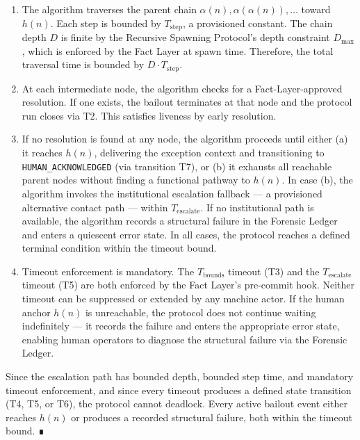 \begin{enumerate}
\item The algorithm traverses the parent chain $\alpha(n), \alpha(\alpha(n)), \ldots$ toward $h(n)$. Each step is bounded by $T_{\text{step}}$, a provisioned constant. The chain depth $D$ is finite by the Recursive Spawning Protocol's depth constraint $D_{\text{max}}$, which is enforced by the Fact Layer at spawn time. Therefore, the total traversal time is bounded by $D \cdot T_{\text{step}}$.

\item At each intermediate node, the algorithm checks for a Fact-Layer-approved resolution. If one exists, the bailout terminates at that node and the protocol run closes via T2. This satisfies liveness by early resolution.

\item If no resolution is found at any node, the algorithm proceeds until either (a) it reaches $h(n)$, delivering the exception context and transitioning to \texttt{HUMAN\_ACKNOWLEDGED} (via transition T7), or (b) it exhausts all reachable parent nodes without finding a functional pathway to $h(n)$. In case (b), the algorithm invokes the institutional escalation fallback — a provisioned alternative contact path — within $T_{\text{escalate}}$. If no institutional path is available, the algorithm records a structural failure in the Forensic Ledger and enters a quiescent error state. In all cases, the protocol reaches a defined terminal condition within the timeout bound.

\item Timeout enforcement is mandatory. The $T_{\text{bounds}}$ timeout (T3) and the $T_{\text{escalate}}$ timeout (T5) are both enforced by the Fact Layer's pre-commit hook. Neither timeout can be suppressed or extended by any machine actor. If the human anchor $h(n)$ is unreachable, the protocol does not continue waiting indefinitely — it records the failure and enters the appropriate error state, enabling human operators to diagnose the structural failure via the Forensic Ledger.
\end{enumerate}

Since the escalation path has bounded depth, bounded step time, and mandatory timeout enforcement, and since every timeout produces a defined state transition (T4, T5, or T6), the protocol cannot deadlock. Every active bailout event either reaches $h(n)$ or produces a recorded structural failure, both within the timeout bound. ∎


